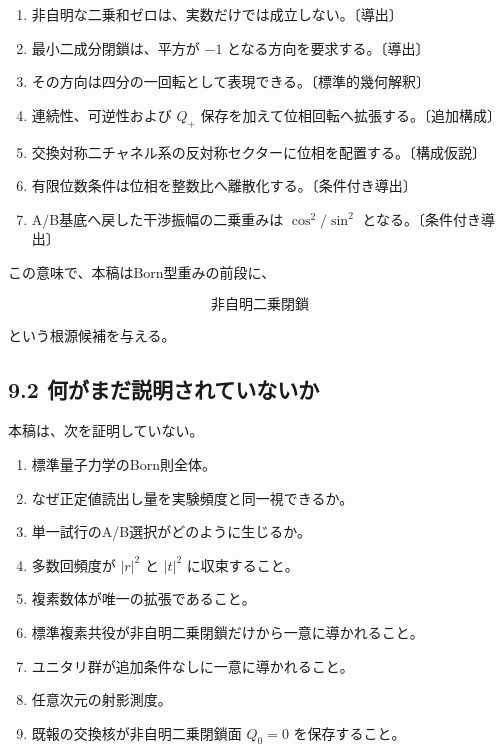 \documentclass[
  a4paper,
  10pt]{article}
\providecommand{\tightlist}{%
  \setlength{\itemsep}{0pt}\setlength{\parskip}{0pt}}
\begin{document}
\begin{enumerate}
\def\labelenumi{\arabic{enumi}.}
\tightlist
\item
  非自明な二乗和ゼロは、実数だけでは成立しない。〔導出〕
\item
  最小二成分閉鎖は、平方が \(-1\) となる方向を要求する。〔導出〕
\item
  その方向は四分の一回転として表現できる。〔標準的幾何解釈〕
\item
  連続性、可逆性および \(Q_+\)
  保存を加えて位相回転へ拡張する。〔追加構成〕
\item
  交換対称二チャネル系の反対称セクターに位相を配置する。〔構成仮説〕
\item
  有限位数条件は位相を整数比へ離散化する。〔条件付き導出〕
\item
  A/B基底へ戻した干渉振幅の二乗重みは \(\cos^2/\sin^2\)
  となる。〔条件付き導出〕
\end{enumerate}

この意味で、本稿はBorn型重みの前段に、

\[
\text{非自明二乗閉鎖}
\]

という根源候補を与える。

\subsection{9.2
何がまだ説明されていないか}\label{92-ux4f55ux304cux307eux3060ux8aacux660eux3055ux308cux3066ux3044ux306aux3044ux304b}

本稿は、次を証明していない。

\begin{enumerate}
\def\labelenumi{\arabic{enumi}.}
\tightlist
\item
  標準量子力学のBorn則全体。
\item
  なぜ正定値読出し量を実験頻度と同一視できるか。
\item
  単一試行のA/B選択がどのように生じるか。
\item
  多数回頻度が \(|r|^2\) と \(|t|^2\) に収束すること。
\item
  複素数体が唯一の拡張であること。
\item
  標準複素共役が非自明二乗閉鎖だけから一意に導かれること。
\item
  ユニタリ群が追加条件なしに一意に導かれること。
\item
  任意次元の射影測度。
\item
  既報の交換核が非自明二乗閉鎖面 \(Q_0=0\) を保存すること。
\end{enumerate}
\end{document}
